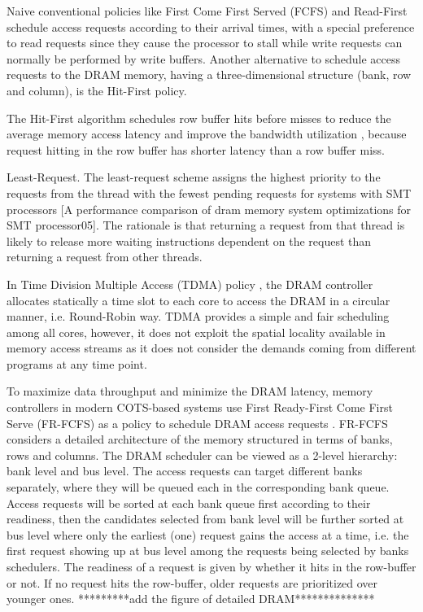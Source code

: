 Naive conventional policies like {First Come First Served} (FCFS) and {Read-First} schedule access requests according to their arrival times, with a special preference to read requests since they cause the processor to stall while write requests can normally be performed by write buffers. 
Another alternative to schedule access requests to the DRAM memory, having a three-dimensional structure (bank, row and column), is the {Hit-First} policy. 

  The Hit-First algorithm schedules row buffer hits before misses to reduce
the average memory access latency and improve the bandwidth
utilization \cite{Hong99,Rixner2000}, because request hitting in the row buffer
has shorter latency than a row buffer miss.

Least-Request. The least-request scheme assigns the
highest priority to the requests from the thread with the
fewest pending requests for systems with SMT processors
[A performance comparison of dram memory system optimizations for SMT processor05]. 
The rationale is that returning a request from
that thread is likely to release more waiting instructions dependent
on the request than returning a request from other
threads.

In {Time Division Multiple Access} (TDMA) policy \cite{tdma}, the DRAM controller allocates statically a time slot to each core to access the DRAM in a circular manner, i.e. Round-Robin way. TDMA provides a simple and fair scheduling among all cores, however, it does not exploit the spatial locality available in memory access streams as it does not consider the demands coming from different programs at any time point.

To maximize data throughput and minimize the DRAM latency, memory controllers in modern COTS-based systems use {First Ready-First Come First Serve} (FR-FCFS) as a policy to schedule DRAM access requests \cite{Rixner2000,Nesbit2006,Kim14}.  FR-FCFS considers a detailed architecture of the memory structured in terms of banks, rows and columns. The DRAM scheduler can be viewed as a 2-level hierarchy: bank level and bus level. The access requests can target different banks separately, where they will be queued each in the corresponding bank queue. Access requests will be sorted at each bank queue first according to their readiness, then the   candidates selected from bank level will be further sorted at bus level where only the earliest (one) request gains the access at a time, i.e. the first request showing up at bus level among the requests being selected by banks schedulers. The readiness of a request is given by whether it hits in the row-buffer or not. If no request hits the row-buffer, older requests are prioritized over younger ones. *********add the figure of detailed DRAM**************
